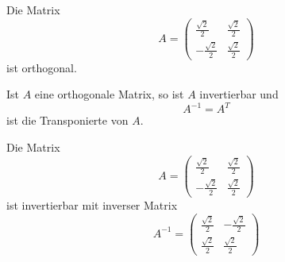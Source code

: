 \begin{beispiel}\label{det_matrix_orth} Die Matrix 
  $$A = \left( \begin{matrix} \frac {\sqrt{2}}{2} & \frac {\sqrt{2}}{2} \\
                              -\frac {\sqrt{2}}{2} & \frac {\sqrt{2}}{2} \end{matrix} \right) $$
ist orthogonal.
\end{beispiel}

\begin{satz}\label{det_matrix_orth_inv} Ist $A$ eine orthogonale Matrix, so ist $A$ invertierbar und 
  	$$ A^{-1} = A^T $$
ist die Transponierte von $A$.
\end{satz}


\medbreak

\begin{beispiel} Die Matrix
  	$$A = \left( \begin{matrix} \frac {\sqrt{2}}{2} & \frac {\sqrt{2}}{2} \\
	-\frac {\sqrt{2}}{2} & \frac {\sqrt{2}}{2} \end{matrix} \right) $$
ist invertierbar mit inverser Matrix 
  	$$A^{-1} = \left( \begin{matrix} \frac {\sqrt{2}}{2} & -\frac {\sqrt{2}}{2} \\
	\frac {\sqrt{2}}{2} & \frac {\sqrt{2}}{2} \end{matrix} \right) $$
\end{beispiel}

